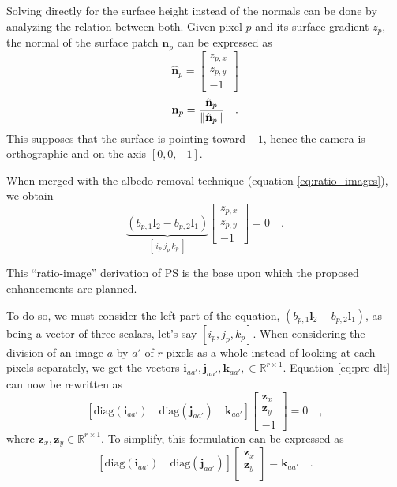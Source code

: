 Solving directly for the surface height instead of the normals can be done by analyzing the relation between both. Given pixel $p$ and its surface gradient $z_p$, the normal of the surface patch $\mathbf{n}_p$ can be expressed as
\begin{equation}
\hat{\mathbf{n}}_p = 
\begin{bmatrix}
z_{p,x} \\
z_{p,y} \\
-1
\end{bmatrix}
\end{equation}
\begin{equation}
\mathbf{n}_p =
\frac{\hat{\mathbf{n}}_p}{\left\lVert\hat{\mathbf{n}}_p\right\rVert} \quad.
\end{equation}
This supposes that the surface is pointing toward $-1$, hence the camera is orthographic and on the axis $[0, 0, -1]$.

When merged with the albedo removal technique (equation \eqref{eq:ratio_images}), we obtain
\begin{equation}
\label{eq:pre-dlt}
\underbrace{ \left( b_{p,1} \mathbf{l}_2 - b_{p,2} \mathbf{l}_1 \right) }_{ [ \ i_p \ j_p \ k_p \ ]}
\begin{bmatrix}
z_{p,x} \\
z_{p,y} \\
-1
\end{bmatrix}
= 0  \quad.
\end{equation}

This ``ratio-image'' derivation of PS is the base upon which the proposed enhancements are planned. %

To do so, we must consider the left part of the equation, $\left( b_{p,1} \mathbf{l}_2 - b_{p,2} \mathbf{l}_1 \right)$, as being a vector of three scalars, let's say $\left[ i_p, j_p, k_p \right]$. When considering the division of an image $a$ by $a'$ of $r$ pixels as a whole instead of looking at each pixels separately, we get the vectors $\mathbf{i}_{aa'}, \mathbf{j}_{aa'}, \mathbf{k}_{aa'}, \in \mathbb{R}^{ r \times 1 }$. Equation \eqref{eq:pre-dlt} can now be rewritten as
\begin{equation}
\left[ \mathrm{diag}(\mathbf{i}_{aa'}) \quad \mathrm{diag}(\mathbf{j}_{aa'}) \quad \mathbf{k}_{aa'}\right]
\begin{bmatrix}
\mathbf{z}_{x} \\
\mathbf{z}_{y} \\
-1
\end{bmatrix}
= 0 \quad,
\end{equation}
where $\mathbf{z}_{x}, \mathbf{z}_{y} \in \mathbb{R}^{ r \times 1 }$.
To simplify, this formulation can be expressed as
\begin{equation}
\label{eq:diagdlt}
\left[ \mathrm{diag}(\mathbf{i}_{aa'}) \quad \mathrm{diag}(\mathbf{j}_{aa'}) \right]
\begin{bmatrix}
\mathbf{z}_{x} \\
\mathbf{z}_{y} \\
\end{bmatrix}
= \mathbf{k}_{aa'} \quad.
\end{equation}

